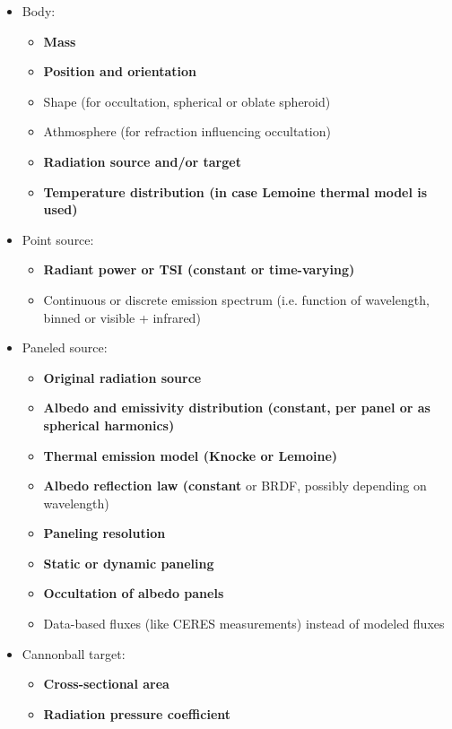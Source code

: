 \documentclass[parskip=full,DIV=15]{scrartcl}
\begin{document}
\begin{itemize}
   \item Body:
   \begin{itemize}
      \item \textbf{Mass}
      \item \textbf{Position and orientation}
      \item Shape (for occultation, spherical or oblate spheroid)
      \item Athmosphere (for refraction influencing occultation)
      \item \textbf{Radiation source and/or target}
      \item \textbf{Temperature distribution (in case Lemoine thermal model is used)}
   \end{itemize}
   \item Point source:
   \begin{itemize}
      \item \textbf{Radiant power or TSI (constant or time-varying)}
      \item Continuous or discrete emission spectrum (i.e. function of wavelength, binned or visible + infrared)
   \end{itemize}
   \item Paneled source:
   \begin{itemize}
      \item \textbf{Original radiation source}
      \item \textbf{Albedo and emissivity distribution (constant, per panel or as spherical harmonics)}
      \item \textbf{Thermal emission model (Knocke or Lemoine)}
      \item \textbf{Albedo reflection law (constant} or BRDF, possibly depending on wavelength)
      \item \textbf{Paneling resolution}
      \item \textbf{Static or dynamic paneling}
      \item \textbf{Occultation of albedo panels}
      \item Data-based fluxes (like CERES measurements) instead of modeled fluxes
   \end{itemize}
   \item Cannonball target:
   \begin{itemize}
      \item \textbf{Cross-sectional area}
      \item \textbf{Radiation pressure coefficient}
   \end{itemize}

\end{itemize}
\end{document}
